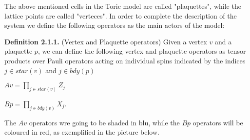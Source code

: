 \documentclass[12pt]{report}
\begin{document}
	
	\begin{minipage}{1\textwidth}
		
		The above mentioned cells in the Toric model are called "plaquettes", while the lattice points are called "verteces".
		In order to complete the description of the system we define the following operators as the main actors of the model:\newline
		
		\textbf{Definition 2.1.1.} (Vertex and Plaquette operators) Given a vertex $v$ and a plaquette $p$, we can define the following vertex and plaquette operators as tensor products over Pauli operators acting on individual spins indicated by the indices $j \in star(v)$ and $j \in bdy(p)$  \newline 
		
		\begin{center}
			$ Av = \prod_{j \in star(v)} Z_j $ \newline
			
			$ Bp = \prod_{j \in bdy(v)} X_j $.\newline
		\end{center}
		
		The $Av$ operators wre going to be shaded in blu, while the $Bp$ operators will be coloured in red, as exemplified in the picture below. \newline
		
		\begin{center}
\end{center}
\end{minipage}
\end{document}
